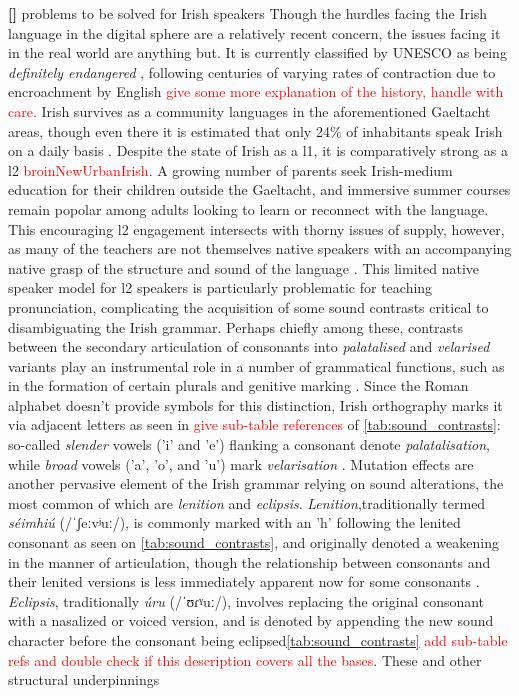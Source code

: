 \documentclass[thesis]{cluu}
\newcounter{paranum}
\newcommand{\numberedparagraph}{\par\refstepcounter{paranum}\textbf{[\theparanum] }}
\newcommand{\todo}[1]{\textcolor{red}{#1}}
\newcommand{\ipa}[1]{{\ipafont #1}}
\begin{document}
\numberedparagraph{problems to be solved for Irish speakers}
Though the hurdles facing the Irish language in the digital sphere are a relatively recent concern, the issues facing it in the real world are anything but. It is currently classified by UNESCO as being \textit{definitely endangered} \parencite{moseleyAtlasWorldsLanguages2010}, following centuries of varying rates of contraction due to encroachment by English \todo{give some more explanation of the history, handle with care}. Irish survives as a community languages in the aforementioned Gaeltacht areas, though even there it is estimated that only 24\% of inhabitants speak Irish on a daily basis \parencite{nichasaideSPEECHTECHNOLOGYDOCUMENTATION}. Despite the state of Irish as a \gls{l1}, it is comparatively strong as a \gls{l2} \todo{broinNewUrbanIrish}. A growing number of parents seek Irish-medium education for their children outside the Gaeltacht, and immersive summer courses remain popolar among adults looking to learn or reconnect with the language. This encouraging \gls{l2} engagement intersects with thorny issues of supply, however, as many of the teachers are not themselves native speakers with an accompanying native grasp of the structure and sound of the language \parencite{nichasaideSPEECHTECHNOLOGYDOCUMENTATION,nichasaideCanWeDefuse2019}. This limited native speaker model for \gls{l2} speakers is particularly problematic for teaching pronunciation, complicating the acquisition of some sound contrasts critical to disambiguating the Irish grammar. Perhaps chiefly among these, contrasts between the secondary articulation of consonants into \textit{palatalised} and \textit{velarised} variants play an instrumental role in a number of grammatical functions, such as in the formation of certain plurals and genitive marking \parencite{snesarevaPalatalizationDublinIrish2016,gabrieleEnglishInfluenceL2,broinNewUrbanIrish,stensonModernIrishComprehensive2020}. Since the Roman alphabet doesn't provide symbols for this distinction, Irish orthography marks it via adjacent letters as seen in \todo{give sub-table references} of \cref{tab:sound_contrasts}: so-called \textit{slender} vowels ('i' and 'e') flanking a consonant denote \textit{palatalisation}, while \textit{broad} vowels ('a', 'o', and 'u') mark \textit{velarisation} \parencite{stensonModernIrishComprehensive2020}. Mutation effects are another pervasive element of the Irish grammar relying on sound alterations, the most common of which are \textit{lenition} and \textit{eclipsis}. \textit{Lenition},traditionally termed \textit{séimhiú} (/\ipa{ˈʃeːvʲuː}/), is commonly marked with an 'h' following the lenited consonant as seen on \cref{tab:sound_contrasts}, and originally denoted a weakening in the manner of articulation, though the relationship between consonants and their lenited versions is less immediately apparent now for some consonants \parencite{stensonModernIrishComprehensive2020}. \textit{Eclipsis}, traditionally \textit{úru} (/\ipa{ˈʊɾˠuː}/), involves replacing the original consonant with a nasalized or voiced version, and is denoted by appending the new sound character before the consonant being eclipsed\ref{tab:sound_contrasts} \todo{add sub-table refs and double check if this description covers all the bases}. These and other structural underpinnings 
\end{document}
